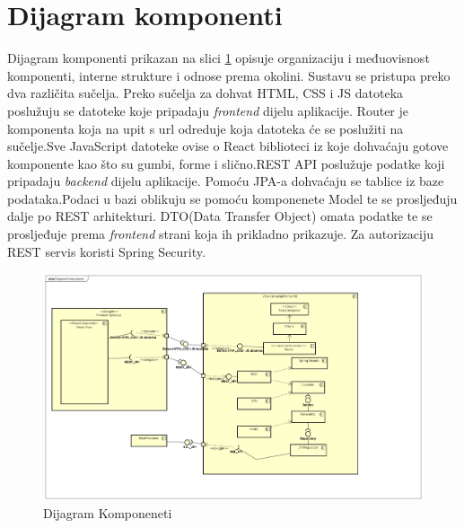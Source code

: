 		\section{Dijagram komponenti}
		
		
			
			\text   Dijagram komponenti prikazan na slici \ref{fig:4.12} opisuje organizaciju i međuovisnost
            komponenti, interne strukture i odnose prema okolini. Sustavu se pristupa preko dva različita sučelja. Preko sučelja za dohvat HTML, CSS i JS datoteka poslužuju se
            datoteke koje pripadaju \emph{frontend} dijelu aplikacije. Router je komponenta koja na
            upit s url odreduje koja datoteka će se poslužiti na sučelje.Sve JavaScript datoteke ovise o React biblioteci iz koje dohvaćaju gotove komponente kao što su gumbi, forme i slično.REST API poslužuje
            podatke koji pripadaju \emph{backend} dijelu aplikacije. Pomoću JPA-a dohvaćaju se tablice iz baze podataka.Podaci  u bazi oblikuju se pomoću komponenete Model te se prosljeđuju dalje po REST arhitekturi. DTO(Data Transfer Object) omata podatke te se prosljeđuje prema \emph{frontend} strani koja ih prikladno prikazuje. Za autorizaciju REST servis koristi Spring Security.
			
		\begin{figure}[H]
			\includegraphics[scale=0.3]{slike/Dijagram Komponeneti.png} %
			\centering
			\caption { Dijagram Komponeneti}
			\label{fig:4.12}
			\end{figure}
			

